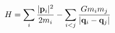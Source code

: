 \documentclass[preview]{standalone}
\begin{document}
\begin{align*}
\special{dvisvgm:raw <g id='unique000'>}H = \sum_{i} \frac{|\mathbf{p}_i|^2}{2m_i}- \sum_{i < j} \frac{G m_i m_j}{|\mathbf{q}_i - \mathbf{q}_j|}\special{dvisvgm:raw </g>}
\end{align*}
\end{document}
